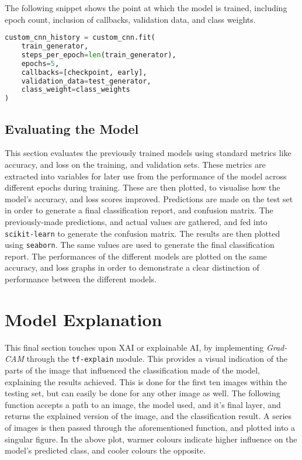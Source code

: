 \documentclass[../main]{subfiles}
\begin{document}
\noindent The following snippet shows the point at which the model is trained,
including epoch count, inclusion of callbacks, validation data, and class
weights.

\begin{lstlisting}[language=Python, caption={Model training of the custom CNN.}]
custom_cnn_history = custom_cnn.fit(
    train_generator,
    steps_per_epoch=len(train_generator),
    epochs=5,
    callbacks=[checkpoint, early],
    validation_data=test_generator,
    class_weight=class_weights
)
\end{lstlisting}

\subsection{Evaluating the Model}
This section evaluates the previously trained models using standard metrics like
accuracy, and loss on the training, and validation sets. These metrics are
extracted into variables for later use from the performance of the model across
different epochs during training. These are then plotted, to visualise how the
model's accuracy, and loss scores improved. Predictions are made on the test set
in order to generate a final classification report, and confusion matrix. The
previously-made predictions, and actual values are gathered, and fed into
\texttt{scikit-learn} to generate the confusion matrix. The results are then
plotted using \texttt{seaborn}. The same values are used to generate the final
classification report. The performances of the different models are plotted on
the same accuracy, and loss graphs in order to demonstrate a clear distinction
of performance between the different models.
 
\section{Model Explanation}
This final section touches upon XAI or explainable AI, by implementing
\emph{Grad-CAM} through the \texttt{tf-explain} module. This provides a visual
indication of the parts of the image that influenced the classification made of
the model, explaining the results achieved. This is done for the first ten
images within the testing set, but can easily be done for any other image as
well. The following function accepts a path to an image, the model used, and
it's final layer, and returns the explained version of the image, and the
classification result. A series of images is then passed through the
aforementioned function, and plotted into a singular figure. In the above plot,
warmer colours indicate higher influence on the model's predicted class, and
cooler colours the opposite.
\end{document}
